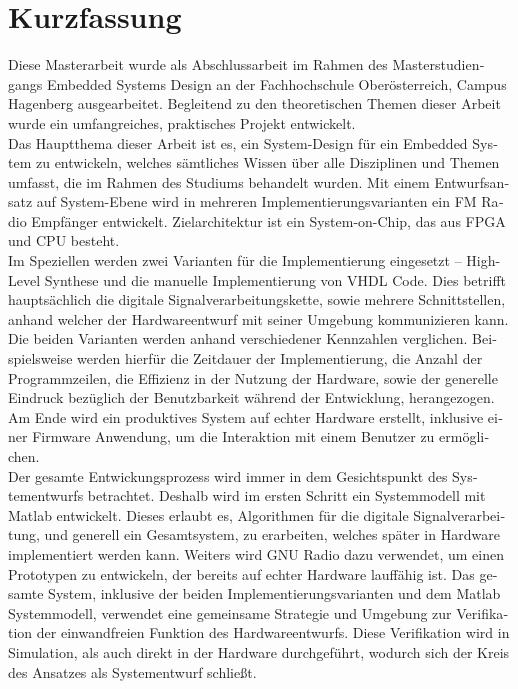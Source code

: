 \chapter{Kurzfassung}

\begin{german}

Diese Masterarbeit wurde als Abschlussarbeit im Rahmen des Masterstudiengangs Embedded Systems Design an der Fachhochschule Oberösterreich, Campus Hagenberg ausgearbeitet.
Begleitend zu den theoretischen Themen dieser Arbeit wurde ein umfangreiches, praktisches Projekt entwickelt.\\

Das Hauptthema dieser Arbeit ist es, ein System-Design für ein Embedded System zu entwickeln, welches sämtliches Wissen über alle Disziplinen und Themen umfasst, die im Rahmen des Studiums behandelt wurden.
Mit einem Entwurfsansatz auf System-Ebene wird in mehreren Implementierungsvarianten ein FM Radio Empfänger entwickelt.
Zielarchitektur ist ein System-on-Chip, das aus FPGA und CPU besteht.\\

Im Speziellen werden zwei Varianten für die Implementierung eingesetzt -- High-Level Synthese und die manuelle Implementierung von VHDL Code.
Dies betrifft hauptsächlich die digitale Signalverarbeitungskette, sowie mehrere Schnittstellen, anhand welcher der Hardwareentwurf mit seiner Umgebung kommunizieren kann.
Die beiden Varianten werden anhand verschiedener Kennzahlen verglichen.
Beispielsweise werden hierfür die Zeitdauer der Implementierung, die Anzahl der Programmzeilen, die Effizienz in der Nutzung der Hardware, sowie der generelle Eindruck bezüglich der Benutzbarkeit während der Entwicklung, herangezogen.
Am Ende wird ein produktives System auf echter Hardware erstellt, inklusive einer Firmware Anwendung, um die Interaktion mit einem Benutzer zu ermöglichen.\\

Der gesamte Entwickungsprozess wird immer in dem Gesichtspunkt des Systementwurfs betrachtet.
Deshalb wird im ersten Schritt ein Systemmodell mit Matlab entwickelt.
Dieses erlaubt es, Algorithmen für die digitale Signalverarbeitung, und generell ein Gesamtsystem, zu erarbeiten, welches später in Hardware implementiert werden kann.
Weiters wird GNU Radio dazu verwendet, um einen Prototypen zu entwickeln, der bereits auf echter Hardware lauffähig ist.
Das gesamte System, inklusive der beiden Implementierungsvarianten und dem Matlab Systemmodell, verwendet eine gemeinsame Strategie und Umgebung zur Verifikation der einwandfreien Funktion des Hardwareentwurfs.
Diese Verifikation wird in Simulation, als auch direkt in der Hardware durchgeführt, wodurch sich der Kreis des Ansatzes als Systementwurf schließt.

\end{german}
